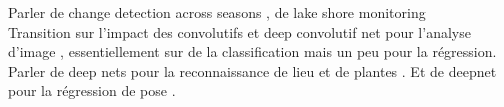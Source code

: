 Parler de change detection across seasons \cite{Neubert2013}, de lake shore monitoring \cite{Griffith2015,Griffith2015b,Griffith2014}\\

Transition sur l'impact des convolutifs \cite{farabet-pami-13} et deep convolutif net pour l'analyse d'image \cite{NIPS2012_4824,Simonyan14c}, essentiellement sur de la classification mais un peu pour la régression.\\

Parler de deep nets pour la reconnaissance de lieu \cite{Sunderhauf2015} et de plantes \cite{Reyes2015}. Et de deepnet pour la régression de pose \cite{conf/accv/PfisterSCZ14}.\\
